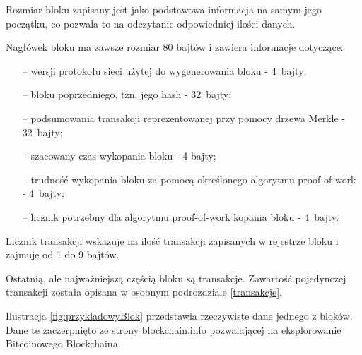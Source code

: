 \documentclass[12pt, twoside, final, openany]{mgr}
\begin{document}
\indent Rozmiar bloku zapisany jest jako podstawowa informacja na samym jego początku, co pozwala to na odczytanie odpowiedniej ilości danych. 

\indent Nagłówek bloku ma zawsze rozmiar 80 bajtów i zawiera informacje dotyczące:
\begin{itemize}
\item[--] wersji protokołu sieci użytej do wygenerowania bloku - 4~bajty;
\item[--] bloku poprzedniego, tzn. jego hash - 32~bajty;
\item[--] podsumowania transakcji reprezentowanej przy pomocy drzewa Merkle - 32~bajty;
\item[--] szacowany czas wykopania bloku - 4 bajty;
\item[--] trudność wykopania bloku za pomocą określonego algorytmu proof-of-work - 4~bajty;
\item[--] licznik potrzebny dla algorytmu proof-of-work kopania bloku - 4~bajty.
\end{itemize} 

\indent Licznik transakcji wskazuje na ilość transakcji zapisanych w rejestrze bloku i zajmuje od 1 do 9 bajtów.

\indent Ostatnią, ale najważniejszą częścią bloku są transakcje. Zawartość pojedynczej transakcji została opisana w osobnym podrozdziale \ref{transakcje}.

\indent Ilustracja \ref{fig:przykladowyBlok} przedstawia rzeczywiste dane jednego z bloków. Dane te zaczerpnięto ze strony blockchain.info pozwalającej na eksplorowanie Bitcoinowego Blockchaina\cite{blockchaininfo}.
\end{document}
